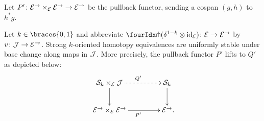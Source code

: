 \documentclass[reqno,10pt,a4paper,oneside,draft]{amsart}
\begin{document}
Let $P' \co \cal{E}^\to \times_{\cal{E}} \cal{E}^\to \to \cal{E}^\to$ be the pullback functor, sending a cospan $(g, h)$ to $h^* g$.

\begin{lemma} \label{strong-h-equiv-uniform-base-change}
Let $k \in \braces{0, 1}$ and abbreviate $\liftr{(\kcylinv \otimes \id_{\cal{E}})} \co \cal{E} \to \cal{E}^\to$ by $v \co \cal{J} \to \cal{E}^\to$.
Strong $k$-oriented homotopy equivalences are uniformly stable under base change along maps in $\cal{J}$.
More precisely, the pullback functor $P'$ lifts to $Q'$ as depicted below:
\begin{equation} \label{strong-h-equiv-uniform-base-change:goal}
\begin{gathered}
\xymatrix@C+2em{
  \cal{S}_k \times_{\cal{E}} \cal{J}
  \ar@{.>}[r]^{Q'}
  \ar[d]
&
  \cal{S}_k
  \ar[d]
\\
  \cal{E}^\to \times_{\cal{E}} \cal{E}^\to
  \ar[r]_{P'}
&
  \cal{E}^\to
\rlap{.}}
\end{gathered}
\end{equation}
\end{lemma}
\end{document}
